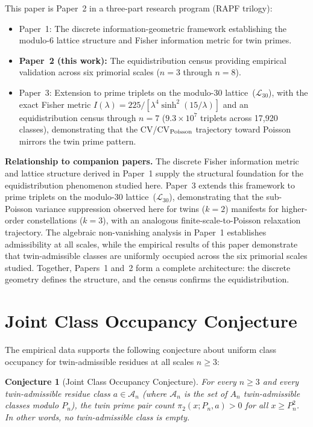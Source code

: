 \documentclass[11pt]{article}
\newtheorem{conjecture}{Conjecture}
\begin{document}
This paper is Paper~2 in a three-part research program (RAPF trilogy):
\begin{itemize}
  \item Paper~1: The discrete information-geometric framework establishing the modulo-6 lattice structure and Fisher information metric for twin primes.
  \item \textbf{Paper~2 (this work):} The equidistribution census providing empirical validation across six primorial scales ($n=3$ through $n=8$).
  \item Paper~3: Extension to prime triplets on the modulo-30 lattice~($\mathcal{L}_{30}$), with the exact Fisher metric $I(\lambda) = 225/[\lambda^4 \sinh^2(15/\lambda)]$ and an equidistribution census through $n=7$ ($9.3 \times 10^7$ triplets across 17{,}920 classes), demonstrating that the CV/CV$_{\rm Poisson}$ trajectory toward Poisson mirrors the twin prime pattern.
\end{itemize}

\noindent\textbf{Relationship to companion papers.} The discrete Fisher information metric and lattice structure derived in Paper~1 supply the structural foundation for the equidistribution phenomenon studied here. Paper~3 extends this framework to prime triplets on the modulo-30 lattice~($\mathcal{L}_{30}$), demonstrating that the sub-Poisson variance suppression observed here for twins ($k=2$) manifests for higher-order constellations ($k=3$), with an analogous finite-scale-to-Poisson relaxation trajectory. The algebraic non-vanishing analysis in Paper~1 establishes admissibility at all scales, while the empirical results of this paper demonstrate that twin-admissible classes are uniformly occupied across the six primorial scales studied. Together, Papers~1 and~2 form a complete architecture: the discrete geometry defines the structure, and the census confirms the equidistribution.

\section{Joint Class Occupancy Conjecture}
\label{sec:occupancy}

The empirical data supports the following conjecture about uniform class occupancy for twin-admissible residues at all scales $n \geq 3$:

\begin{conjecture}[Joint Class Occupancy Conjecture]
\label{conj:joint}
For every $n \geq 3$ and every twin-admissible residue class $a \in \mathcal{A}_n$ (where $\mathcal{A}_n$ is the set of $A_n$ twin-admissible classes modulo $P_n$), the twin prime pair count $\pi_2(x; P_n, a) > 0$ for all $x \geq P_n^2$. In other words, no twin-admissible class is empty.
\end{conjecture}
\end{document}
